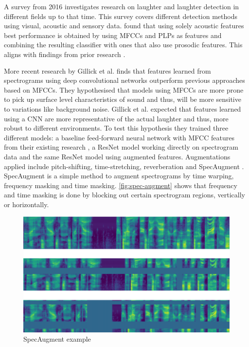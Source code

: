 \documentclass[bsc,frontabs,parskip,deptreport]{infthesis}
\begin{document}
A survey from 2016 \citep{cosentino2016quantitative} investigates research on laughter and laughter detection in different fields up to that time.
This survey covers different detection methods using visual, acoustic and sensory data.
\citeauthor{cosentino2016quantitative} found that using solely acoustic features best performance is obtained by using MFCCs and PLPs as features and combining the resulting classifier with ones that also use prosodic features.
This aligns with findings from prior research \citep{truong2007automatic, knox2006automatic}.

More recent research by Gillick et al. \citep{gillick2021robust} finds that features learned from spectrograms using deep convolutional networks outperform previous approaches based on MFCCs.
They hypothesised that models using MFCCs are more prone to pick up surface level characteristics of sound and thus, will be more sensitive to variations like background noise.
Gillick et al. expected that features learned using a CNN are more representative of the actual laughter and thus, more robust to different environments. 
To test this hypothesis they trained three different models: a baseline feed-forward neural network with MFCC features from their existing research \citep{ryokai2018capturing}, a ResNet model working directly on spectrogram data and the same ResNet model using augmented features. Augmentations applied include pitch-shifting, time-stretching, reverberation and SpecAugment \citep{park2019specaugment}. SpecAugment is a simple method to augment spectrograms by time warping, frequency masking and time masking. \autoref{fig:spec-augment} shows that frequency and time masking is done by blocking out certain spectrogram regions, vertically or horizontally. 

\begin{figure}[h!]
    \centering
    \includegraphics[width=13cm]{imgs/examples/spec_augment_example.png}
    \caption{SpecAugment example}
    \label{fig:spec-augment}
\end{figure}
\end{document}
